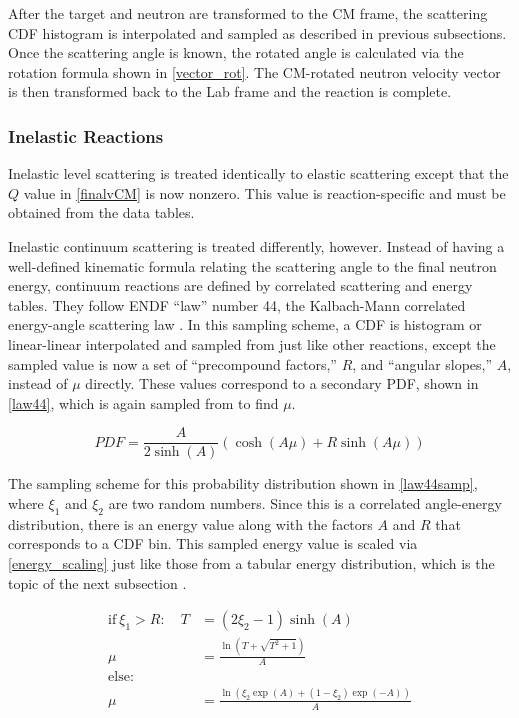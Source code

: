 After the target and neutron are transformed to the CM frame, the scattering CDF histogram is interpolated and sampled as described in previous subsections. %
 Once the scattering angle is known, the rotated angle is calculated via the rotation formula shown in \eqref{vector_rot}.  The CM-rotated neutron velocity vector is then transformed back to the Lab frame and the reaction is complete.

\subsubsection{Inelastic Reactions}

Inelastic level scattering is treated identically to elastic scattering except that the $Q$ value in \eqref{finalvCM} is now nonzero.  This value is reaction-specific and must be obtained from the data tables.  

Inelastic continuum scattering is treated differently, however.  Instead of having a well-defined kinematic formula relating the scattering angle to the final neutron energy, continuum reactions are defined by correlated scattering and energy tables.  They follow ENDF ``law'' number 44, the Kalbach-Mann correlated energy-angle scattering law \cite{mcnp} \cite{openmc}.  In this sampling scheme, a CDF is histogram or linear-linear interpolated and sampled from just like other reactions, except the sampled value is now a set of ``precompound factors,'' $R$, and ``angular slopes,'' $A$, instead of $\mu$ directly.  These values correspond to a secondary PDF, shown in \eqref{law44}, which is again sampled from to find $\mu$.

\begin{equation}
\label{law44}
PDF = \frac{A}{2 \sinh (A)} ( \cosh(A\mu)+R \sinh (A\mu))
\end{equation}

The sampling scheme for this probability distribution shown in \eqref{law44samp}, where $\xi_1$ and $\xi_2$ are two random numbers.  Since this is a correlated angle-energy distribution, there is an energy value along with the factors $A$ and $R$ that corresponds to a CDF bin.  This sampled energy value is scaled via \eqref{energy_scaling} just like those from a tabular energy distribution, which is the topic of the next subsection \cite{3rdsampler}\cite{openmc}.

\begin{equation}
\label{law44samp}
\begin{split}
\mathrm{if} \: \xi_1 > R:  \quad T&=(2\xi_2-1)\sinh(A)\\
\mu &= \frac{\ln(T+\sqrt{T^2+1})}{A}\\
\mathrm{else: }  \qquad & \\
\mu &= \frac{ \ln(\xi_2 \exp(A) + (1-\xi_2)\exp(-A))}{A}
\end{split}
\end{equation}

